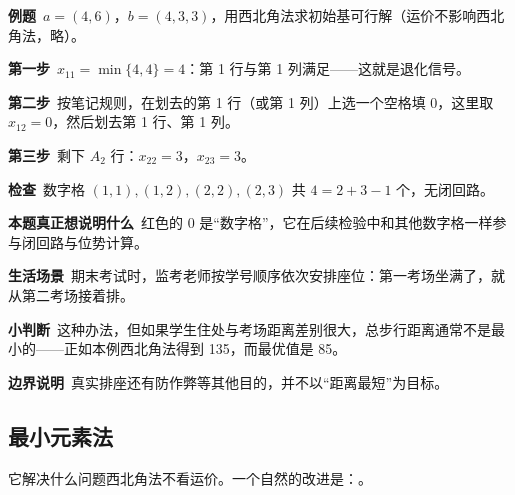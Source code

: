 \begin{examplebox}[西北角法中出现退化]
\textbf{例题}\ $a=(4,6)$，$b=(4,3,3)$，用西北角法求初始基可行解（运价不影响西北角法，略）。\par
\begin{minipage}{0.55\linewidth}
\textbf{第一步}\ $x_{11}=\min\{4,4\}=4$：第 1 行与第 1 列满足——这就是退化信号。\par
\textbf{第二步}\ 按笔记规则，在划去的第 1 行（或第 1 列）上选一个空格填 0，这里取 $x_{12}=0$，然后划去第 1 行、第 1 列。\par
\textbf{第三步}\ 剩下 $A_2$ 行：$x_{22}=3$，$x_{23}=3$。\par
\textbf{检查}\ 数字格 $(1,1),(1,2),(2,2),(2,3)$ 共 $4=2+3-1$ 个，无闭回路。
\end{minipage}\hfill
\begin{minipage}{0.42\linewidth}\centering
{}
\end{minipage}\par
\textbf{本题真正想说明什么}\ 红色的 0 是“数字格”，它在后续检验中和其他数字格一样参与闭回路与位势计算。
\end{examplebox}
\begin{lifebox}[考场按学号排座]
\textbf{生活场景}\ 期末考试时，监考老师按学号顺序依次安排座位：第一考场坐满了，就从第二考场接着排。\par
{}
\textbf{小判断}\ 这种办法，但如果学生住处与考场距离差别很大，总步行距离通常不是最小的——正如本例西北角法得到 135，而最优值是 85。\par
\textbf{边界说明}\ 真实排座还有防作弊等其他目的，并不以“距离最短”为目标。
\end{lifebox}

\subsection{最小元素法}
\noindent\textsf{\color{blue2}它解决什么问题}\quad 西北角法不看运价。一个自然的改进是：。

